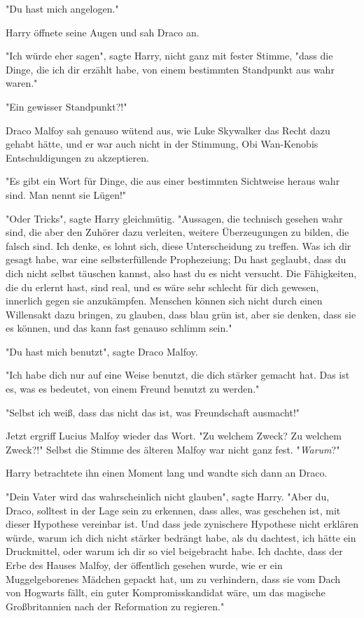 {"Du hast mich angelogen."

Harry öffnete seine Augen und sah Draco an.

"Ich würde eher sagen", sagte Harry, nicht ganz mit fester Stimme, "dass die Dinge, die ich dir erzählt habe, von einem bestimmten Standpunkt aus wahr waren."

"Ein gewisser Standpunkt?!"

Draco Malfoy sah genauso wütend aus, wie Luke Skywalker das Recht dazu gehabt hätte, und er war auch nicht in der Stimmung, Obi Wan-Kenobis Entschuldigungen zu akzeptieren.

"Es gibt ein Wort für Dinge, die aus einer bestimmten Sichtweise heraus wahr sind. Man nennt sie Lügen!"

"Oder Tricks", sagte Harry gleichmütig. "Aussagen, die technisch gesehen wahr sind, die aber den Zuhörer dazu verleiten, weitere Überzeugungen zu bilden, die falsch sind. Ich denke, es lohnt sich, diese Unterscheidung zu treffen. Was ich dir gesagt habe, war eine selbsterfüllende Prophezeiung; Du hast geglaubt, dass du dich nicht selbst täuschen kannst, also hast du es nicht versucht. Die Fähigkeiten, die du erlernt hast, sind real, und es wäre sehr schlecht für dich gewesen, innerlich gegen sie anzukämpfen. Menschen können sich nicht durch einen Willensakt dazu bringen, zu glauben, dass blau grün ist, aber sie denken, dass sie es können, und das kann fast genauso schlimm sein."

"Du hast mich benutzt", sagte Draco Malfoy.

"Ich habe dich nur auf eine Weise benutzt, die dich stärker gemacht hat. Das ist es, was es bedeutet, von einem Freund benutzt zu werden."

"Selbst ich weiß, dass das nicht das ist, was Freundschaft ausmacht!"

Jetzt ergriff Lucius Malfoy wieder das Wort. "Zu welchem Zweck? Zu welchem Zweck?!" Selbst die Stimme des älteren Malfoy war nicht ganz fest. "\emph{Warum}?"

Harry betrachtete ihn einen Moment lang und wandte sich dann an Draco.

"Dein Vater wird das wahrscheinlich nicht glauben", sagte Harry. "Aber du, Draco, solltest in der Lage sein zu erkennen, dass alles, was geschehen ist, mit dieser Hypothese vereinbar ist. Und dass jede zynischere Hypothese nicht erklären würde, warum ich dich nicht stärker bedrängt habe, als du dachtest, ich hätte ein Druckmittel, oder warum ich dir so viel beigebracht habe. Ich dachte, dass der Erbe des Hauses Malfoy, der öffentlich gesehen wurde, wie er ein Muggelgeborenes Mädchen gepackt hat, um zu verhindern, dass sie vom Dach von Hogwarts fällt, ein guter Kompromisskandidat wäre, um das magische Großbritannien nach der Reformation zu regieren."

}
